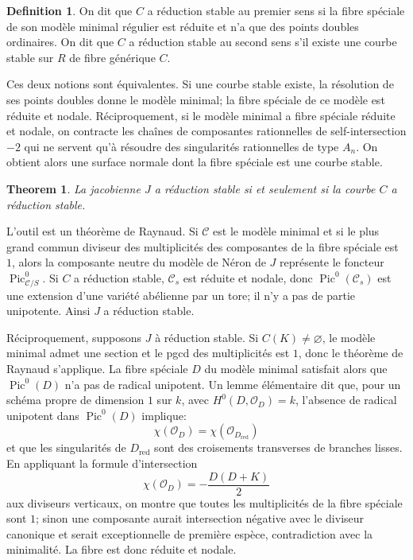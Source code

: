 \documentclass[11pt]{article}
\DeclareMathOperator{\Pic}{Pic}
\theoremstyle{plain}
\newtheorem*{theorem*}{Theorem}
\theoremstyle{definition}
\newtheorem*{definition*}{Definition}
\theoremstyle{remark}
\begin{document}
\begin{definition*}
On dit que \(C\) a réduction stable au premier sens si la fibre spéciale de son modèle minimal régulier est réduite et n'a que des points doubles ordinaires. On dit que \(C\) a réduction stable au second sens s'il existe une courbe stable sur \(R\) de fibre générique \(C\).
\end{definition*}

Ces deux notions sont équivalentes. Si une courbe stable existe, la résolution de ses points doubles donne le modèle minimal; la fibre spéciale de ce modèle est réduite et nodale. Réciproquement, si le modèle minimal a fibre spéciale réduite et nodale, on contracte les chaînes de composantes rationnelles de self-intersection \(-2\) qui ne servent qu'à résoudre des singularités rationnelles de type \(A_n\). On obtient alors une surface normale dont la fibre spéciale est une courbe stable.

\begin{theorem*}
La jacobienne \(J\) a réduction stable si et seulement si la courbe \(C\) a réduction stable.
\end{theorem*}

L'outil est un théorème de Raynaud. Si \(\mathcal C\) est le modèle minimal et si le plus grand commun diviseur des multiplicités des composantes de la fibre spéciale est \(1\), alors la composante neutre du modèle de Néron de \(J\) représente le foncteur \(\Pic^0_{\mathcal C/S}\). Si \(C\) a réduction stable, \(\mathcal C_s\) est réduite et nodale, donc \(\Pic^0(\mathcal C_s)\) est une extension d'une variété abélienne par un tore; il n'y a pas de partie unipotente. Ainsi \(J\) a réduction stable.

Réciproquement, supposons \(J\) à réduction stable. Si \(C(K)\ne\varnothing\), le modèle minimal admet une section et le pgcd des multiplicités est \(1\), donc le théorème de Raynaud s'applique. La fibre spéciale \(D\) du modèle minimal satisfait alors que \(\Pic^0(D)\) n'a pas de radical unipotent. Un lemme élémentaire dit que, pour un schéma propre de dimension \(1\) sur \(k\), avec \(H^0(D,\mathcal O_D)=k\), l'absence de radical unipotent dans \(\Pic^0(D)\) implique:
\[
 \chi(\mathcal O_D)=\chi(\mathcal O_{D_{\mathrm{red}}})
\]
et que les singularités de \(D_{\mathrm{red}}\) sont des croisements transverses de branches lisses. En appliquant la formule d'intersection
\[
 \chi(\mathcal O_D)=-\frac{D(D+K)}{2}
\]
aux diviseurs verticaux, on montre que toutes les multiplicités de la fibre spéciale sont \(1\); sinon une composante aurait intersection négative avec le diviseur canonique et serait exceptionnelle de première espèce, contradiction avec la minimalité. La fibre est donc réduite et nodale.
\end{document}
